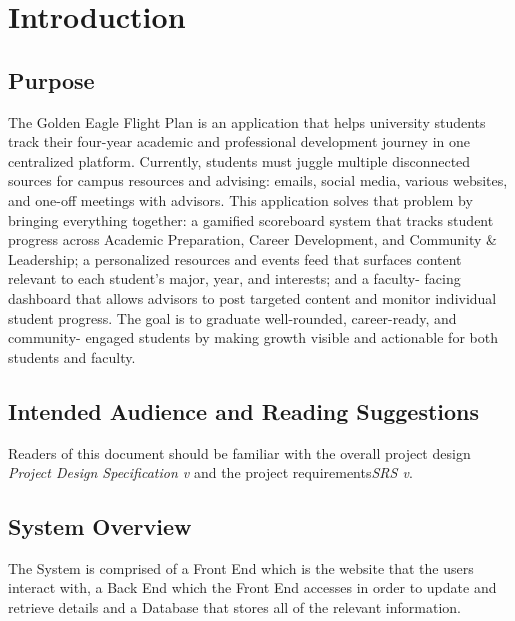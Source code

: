 \newcommand{\documentName}{Software Design Document}
\newcommand{\shortDocumentName}{SDD}





\firstPageBlock

\newpage %
\section{Introduction}
\subsection{Purpose}
The Golden Eagle Flight Plan is an application that helps university students track their four-year academic and professional development journey in one centralized platform.
Currently, students must juggle multiple disconnected sources for campus resources and advising: emails, social media, various websites, and one-off meetings with advisors.
This application solves that problem by bringing everything together: a gamified scoreboard system that tracks student progress across Academic Preparation, Career
Development, and Community \& Leadership; a personalized resources and events feed that surfaces content relevant to each student's major, year, and interests; and a faculty-
facing dashboard that allows advisors to post targeted content and monitor individual student progress. The goal is to graduate well-rounded, career-ready, and community-
engaged students by making growth visible and actionable for both students and faculty.


\subsection{Intended Audience and Reading Suggestions}
Readers of this document should be familiar with the overall project design \emph{Project Design Specification v\currentVersion} and the project requirements\emph{SRS v\currentVersion}.

\subsection{System Overview}
The System is comprised of a Front End which is the website that the users interact with, a Back End which the Front End accesses in order to update and retrieve details and a Database that stores all of the relevant information.


